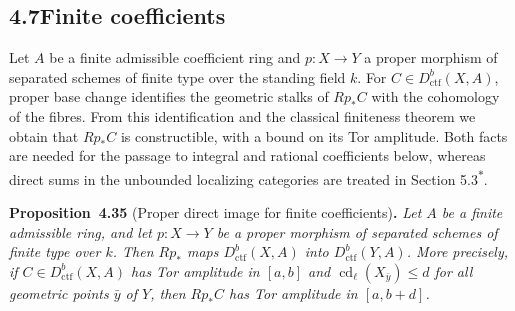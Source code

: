\documentclass[11pt]{article}
\newenvironment{bpstatement}[2]{\par\addvspace{0.6\baselineskip}\noindent\textbf{#1}#2\textbf{.}\enspace\ignorespaces}
  {\par\addvspace{0.4\baselineskip}}
\newenvironment{bpstatementit}[2]{\begin{bpstatement}{#1}{#2}\itshape\ignorespaces}{\end{bpstatement}}
\newcommand{\bpout}[1]{#1\textsuperscript{\hyperlink{bp-outside}{\ensuremath{\ast}}}}
\begin{document}
\subsection*{\texorpdfstring{4.7\quad Finite coefficients}{4.7 Finite coefficients}}
\label{bp104}%
\label{bp105}%
Let \(A\) be a finite admissible coefficient ring and \(p:X\to Y\) a proper morphism of separated schemes of finite type over the standing field \(k\). For \(C\in D^b_{\mathrm{ctf}}(X,A)\), proper base change identifies the geometric stalks of \(Rp_*C\) with the cohomology of the fibres. From this identification and the classical finiteness theorem we obtain that \(Rp_*C\) is constructible, with a bound on its Tor amplitude. Both facts are needed for the passage to integral and rational coefficients below, whereas direct sums in the unbounded localizing categories are treated in Section \bpout{5.3}.

\label{bp106}%
\begin{bpstatementit}{Proposition~4.35}{ (Proper direct image for finite coefficients)}
Let \(A\) be a finite admissible ring, and let \(p:X\to Y\) be a proper morphism of separated schemes of finite type over \(k\). Then \(Rp_*\) maps \(D^b_{\mathrm{ctf}}(X,A)\) into \(D^b_{\mathrm{ctf}}(Y,A)\). More precisely, if \(C\in D^b_{\mathrm{ctf}}(X,A)\) has Tor amplitude in \([a,b]\) and \(\operatorname{cd}_\ell(X_{\bar y})\leq d\) for all geometric points \(\bar y\) of \(Y\), then \(Rp_*C\) has Tor amplitude in \([a,b+d]\).
\end{bpstatementit}
\end{document}
